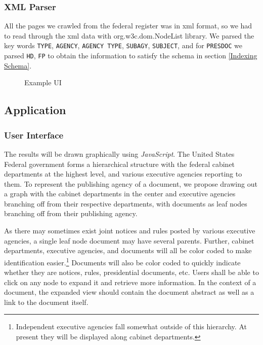 \documentclass{sig-alternate-05-2015}
\begin{document}
\subsubsection{XML Parser}
All the pages we crawled from the federal register was in xml format, so we had to read through the xml data with org.w3c.dom.NodeList library. We parsed the key words \texttt{TYPE}, \texttt{AGENCY}, \texttt{AGENCY TYPE}, \texttt{SUBAGY}, \texttt{SUBJECT}, and for \texttt{PRESDOC} we parsed \texttt{HD}, \texttt{FP} to obtain the information to satisfy the schema in section \ref{Indexing Schema}.\\

\begin{figure}
\centering
{}
\caption{Example UI}
\end{figure}

\subsection{Application}

\subsubsection{User Interface}
The results will be drawn graphically using \emph{JavaScript}. The United States Federal government forms a hierarchical structure with the federal cabinet departments at the highest level, and various executive agencies reporting to them. To represent the publishing agency of a document, we propose drawing out a graph with the cabinet departments in the center and executive agencies branching off from their respective departments, with documents as leaf nodes branching off from their publishing agency. 

As there may sometimes exist joint notices and rules posted by various executive agencies, a single leaf node document may have several parents. Further, cabinet departments, executive agencies, and documents will all be color coded to make identification easier.\footnote{Independent executive agencies fall somewhat outside of this hierarchy. At present they will be displayed along cabinet departments.} Documents will also be color coded to quickly indicate whether they are notices, rules, presidential documents, etc. Users shall be able to click on any node to expand it and retrieve more information. In the context of a document, the expanded view should contain the document abstract as well as a link to the document itself.
\end{document}
